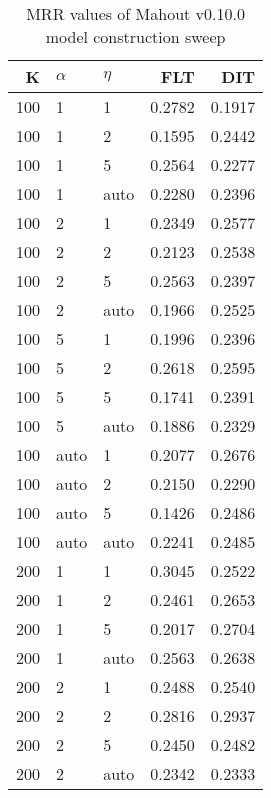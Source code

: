 
\begin{table}
\begin{spacing}{1.2}
\centering
\caption{MRR values of Mahout v0.10.0 model construction sweep}
\label{table:mahout_model_sweep}
\vspace{0.2em}
\parbox{.45\linewidth}{\centering \begin{tabular}{rll|rr}
\toprule
   K & $\alpha$ &   $\eta$ & FLT & DIT \\
\midrule
 100 &     1 &     1 &           0.2782 & 0.1917 \\
 100 &     1 &     2 &           0.1595 & 0.2442 \\
 100 &     1 &     5 &           0.2564 & 0.2277 \\
 100 &     1 &  auto &           0.2280 & 0.2396 \\
 100 &     2 &     1 &           0.2349 & 0.2577 \\
 100 &     2 &     2 &           0.2123 & 0.2538 \\
 100 &     2 &     5 &           0.2563 & 0.2397 \\
 100 &     2 &  auto &           0.1966 & 0.2525 \\
 100 &     5 &     1 &           0.1996 & 0.2396 \\
 100 &     5 &     2 &           0.2618 & 0.2595 \\
 100 &     5 &     5 &           0.1741 & 0.2391 \\
 100 &     5 &  auto &           0.1886 & 0.2329 \\
 100 &  auto &     1 &           0.2077 & 0.2676 \\
 100 &  auto &     2 &           0.2150 & 0.2290 \\
 100 &  auto &     5 &           0.1426 & 0.2486 \\
 100 &  auto &  auto &           0.2241 & 0.2485 \\
 200 &     1 &     1 &           0.3045 & 0.2522 \\
 200 &     1 &     2 &           0.2461 & 0.2653 \\
 200 &     1 &     5 &           0.2017 & 0.2704 \\
 200 &     1 &  auto &           0.2563 & 0.2638 \\
 200 &     2 &     1 &           0.2488 & 0.2540 \\
 200 &     2 &     2 &           0.2816 & 0.2937 \\
 200 &     2 &     5 &           0.2450 & 0.2482 \\
 200 &     2 &  auto &           0.2342 & 0.2333 \\

\end{tabular}}
\end{spacing}
\end{table}
